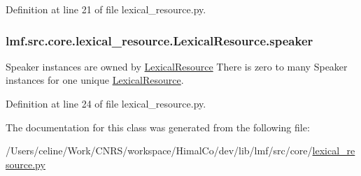 Definition at line 21 of file lexical\+\_\+resource.\+py.

\hypertarget{classlmf_1_1src_1_1core_1_1lexical__resource_1_1_lexical_resource_a378c5ca2854f818361547eee196d3497}{
\subsubsection[{speaker}]{\setlength{\rightskip}{0pt plus 5cm}lmf.\+src.\+core.\+lexical\+\_\+resource.\+Lexical\+Resource.\+speaker}}\label{classlmf_1_1src_1_1core_1_1lexical__resource_1_1_lexical_resource_a378c5ca2854f818361547eee196d3497}


Speaker instances are owned by \hyperlink{classlmf_1_1src_1_1core_1_1lexical__resource_1_1_lexical_resource}{Lexical\+Resource} There is zero to many Speaker instances for one unique \hyperlink{classlmf_1_1src_1_1core_1_1lexical__resource_1_1_lexical_resource}{Lexical\+Resource}. 



Definition at line 24 of file lexical\+\_\+resource.\+py.



The documentation for this class was generated from the following file\+:\begin{DoxyCompactItemize}
\item 
/\+Users/celine/\+Work/\+C\+N\+R\+S/workspace/\+Himal\+Co/dev/lib/lmf/src/core/\hyperlink{lexical__resource_8py}{lexical\+\_\+resource.\+py}\end{DoxyCompactItemize}
